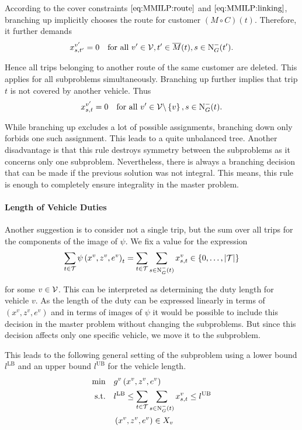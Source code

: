 According to the cover constraints $\eqref{eq:MMILP:route}$ and $\eqref{eq:MMILP:linking}$, branching up implicitly chooses the route for customer $(M\circ C)(t)$. Therefore, it further demands
\begin{align*}
	x^{v'}_{s,t'} = 0 && \text{for all } v'\in\mathcal{V}, t'\in\overline{M}(t), s\in\operatorname{N}_G^-(t').
\end{align*}

Hence all trips belonging to another route of the same customer are deleted. This applies for all subproblems simultaneously. Branching up further implies that trip $t$ is not covered by another vehicle. Thus
\begin{align*}
	x^{v'}_{s,t} = 0 && \text{for all } v'\in\mathcal{V}\backslash\left\{v\right\}, s\in\operatorname{N}_G^-(t).
\end{align*}

While branching up excludes a lot of possible assignments, branching down only forbids one such assignment. This leads to a quite unbalanced tree. Another disadvantage is that this rule destroys symmetry between the subproblems as it concerns only one subproblem. Nevertheless, there is always a branching decision that can be made if the previous solution was not integral. This means, this rule is enough to completely ensure integrality in the master problem.

\paragraph{Length of Vehicle Duties} \parfill

Another suggestion is to consider not a single trip, but the sum over all trips for the components of the image of $\psi$. We fix a value for the expression
\begin{align*}
	\sum_{t\in\mathcal{T}}\psi\left(x^v,z^v,e^v\right)_t = \sum_{t\in\mathcal{T}} \sum_{s\in\operatorname{N}_G^-(t)} x^v_{s,t} \in\left\{0,\dots,\vert\mathcal{T}\vert\right\}
\end{align*}

for some $v\in\mathcal{V}$. This can be interpreted as determining the duty length for vehicle $v$. As the length of the duty can be expressed linearly in terms of $\left(x^v,z^v,e^v\right)$ and in terms of images of $\psi$ it would be possible to include this decision in the master problem without changing the subproblems. But since this decision affects only one specific vehicle, we move it to the subproblem.

This leads to the following general setting of the subproblem using a lower bound $l^{\operatorname{LB}}$ and an upper bound $l^{\operatorname{UB}}$ for the vehicle length.
\begin{align}
	\min \quad & g^v\left(x^v,z^v,e^v\right) \nonumber \\
	\text{s.t.} \quad & l^{\operatorname{LB}} \leq \sum_{t\in\mathcal{T}} \sum_{s\in\operatorname{N}_G^-(t)} x^v_{s,t} \leq l^{\operatorname{UB}} \label{eq:SPv:duty_length} \\
	& \left(x^v,z^v,e^v\right)\in X_v \nonumber
\end{align}

